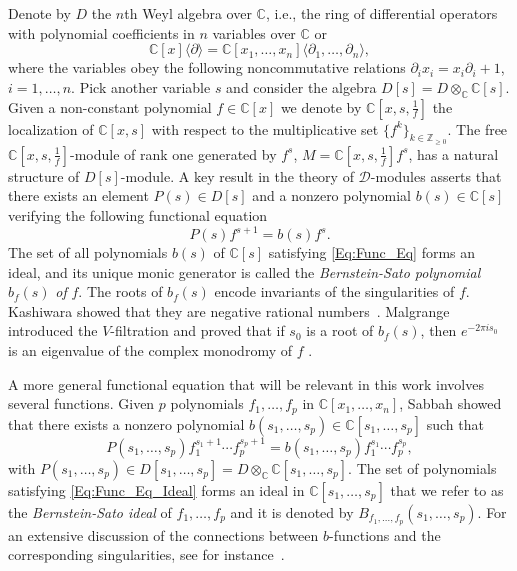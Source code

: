 \documentclass[a4paper,12pt]{amsart}
\theoremstyle{plain}
\theoremstyle{definition}
\theoremstyle{remark}
\def\CC{\mathbb{C}}
\def\ZZ{\mathbb{Z}}
\begin{document}
Denote by $D$ the $n$th Weyl algebra over $\CC$, i.e., the ring of differential operators with polynomial coefficients in $n$ variables over $\CC$ or 
\[
\CC [x] \langle\partial\rangle=\CC [x_1,\ldots,x_n] \langle \partial_1,\ldots,\partial_n\rangle,
\] 
where the variables obey the following noncommutative relations $\partial_i x_i = x_i \partial_i + 1$, $i=1,\ldots,n$.
Pick another variable $s$ and consider the algebra $D[s]=D\otimes_\CC\CC[s]$. Given a non-constant polynomial $f \in \CC[x]$ we denote by $\CC[x,s,\frac{1}{f}]$ the localization of $\CC[x,s]$ with respect to the multiplicative set $\{f^k\}_{k\in \ZZ_{\geq 0}}$.
The free $\CC[x,s,\frac{1}{f}]$-module of rank one generated by $f^s$, $M=\CC[x,s,\frac{1}{f}] f^s$, has a natural structure
of $D[s]$-module.
A key result \cite{Ber72} in the theory of $\mathcal{D}$-modules asserts that there exists an element $P(s) \in D[s]$ and a nonzero polynomial $b(s)\in \CC[s]$ verifying the following functional equation 
\begin{equation}\label{Eq:Func_Eq}
	P(s)f^{s+1} = b(s)f^s.
\end{equation}
The set of all polynomials $b(s)$ of $\CC[s]$ satisfying \eqref{Eq:Func_Eq} forms an ideal, and its unique monic generator is called the \textit{Bernstein-Sato polynomial} $b_f(s)$ \textit{of} $f$.
The roots of $b_f(s)$ encode invariants of the singularities of $f$. Kashiwara showed that they are negative rational
numbers~\cite{Kas76}. Malgrange introduced the $V$-filtration and proved that if $s_0$ is a root of $b_f(s)$, then $e^{-2\pi is_0}$ is an eigenvalue of the complex monodromy of $f$ \cite{Mal74,Mal83}.

A more general functional equation that will be relevant in this work involves several functions. 
Given $p$ polynomials $f_1,\ldots,f_p$ in $\CC[x_1,\ldots,x_n]$,
Sabbah \cite{Sab87} showed that there exists a nonzero polynomial $b(s_1,\ldots,s_p) \in \CC[s_1,\ldots,s_p]$ such that
\begin{equation}\label{Eq:Func_Eq_Ideal}
	P(s_1,\ldots,s_p)f_1^{s_1+1}\cdots f_p^{s_p+1} = b(s_1,\ldots,s_p)f_1^{s_1}\cdots f_p^{s_p},
\end{equation}
with $P(s_1,\ldots,s_p)\in D[s_1,\ldots,s_p] = D \otimes_\CC \CC[s_1,\ldots,s_p]$.
The set of polynomials satisfying \eqref{Eq:Func_Eq_Ideal} forms an ideal in $\CC[s_1,\ldots,s_p]$ that we refer to as the \textit{Bernstein-Sato ideal} of $f_1,\ldots,f_p$ and it is denoted by
$B_{f_1,\ldots,f_p}(s_1,\ldots,s_p)$.
For an extensive discussion of the connections between $b$-functions and the corresponding singularities, see for instance~\cite{Po18, AJNB21}.
\end{document}
